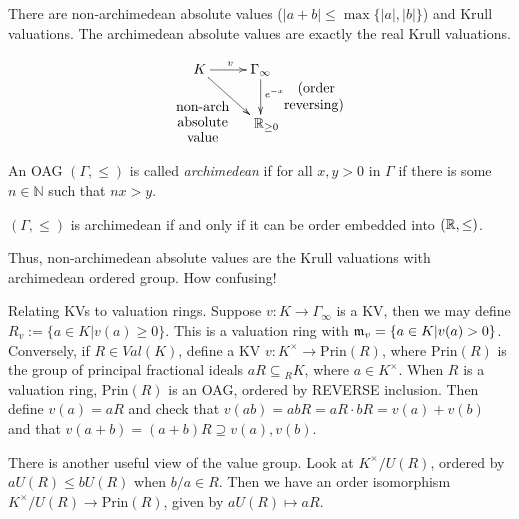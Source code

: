  \setcounter{lecture}{34}

 There are non-archimedean absolute values ($|a+b|\le \max\{|a|,|b|\}$) and Krull
 valuations. The archimedean absolute values are exactly the real Krull valuations.

 \[\xymatrix{
 K\ar[r]^v \ar[dr]_{\txt{non-arch\\ absolute \\ value}} & \Gamma_\infty \ar[d]^{e^{-x}\txt{ (order\\ reversing)}}\\
  & **[r] \RR_{\ge 0}
 }\]

 An OAG $(\Gamma,\le)$ is called \emph{archimedean} if for all $x,y>0$ in
 $\Gamma$ if there is some $n\in \mathbb{N}$ such that $nx>y$.

 \begin{theorem}[H\"older, 1901]
   $(\Gamma,\le)$ is archimedean if and only if it can be order embedded into
   $(\mathbb{R},\le)$.
 \end{theorem}
 Thus, non-archimedean absolute values are the Krull valuations with archimedean ordered
 group. How confusing!

 Relating KVs to valuation rings. Suppose $v:K\to \Gamma_\infty$ is a KV, then we may
 define $R_v:=\{a\in K| v(a)\ge 0\}$. This is a valuation ring with $\mathfrak{m}_v=\{a\in
 K|v(a)>0\}$. Conversely, if $R\in Val(K)$, define a KV $v:K^\times \to \text{Prin}(R)$,
 where $\text{Prin}(R)$ is the group of principal fractional ideals $aR\subseteq {}_R K$,
 where $a\in K^\times$. When $R$ is a valuation ring, $\text{Prin}(R)$ is an OAG, ordered
 by REVERSE inclusion. Then define $v(a)=aR$ and check that $v(ab)=abR=aR\cdot
 bR=v(a)+v(b)$ and that $v(a+b)=(a+b)R \supseteq v(a), v(b)$.

 There is another useful view of the value group. Look at $K^\times /U(R)$, ordered by
 $aU(R)\le bU(R)$ when $b/a\in R$. Then we have an order isomorphism $K^\times/U(R)\to
 \text{Prin}(R)$, given by $aU(R)\mapsto aR$.

